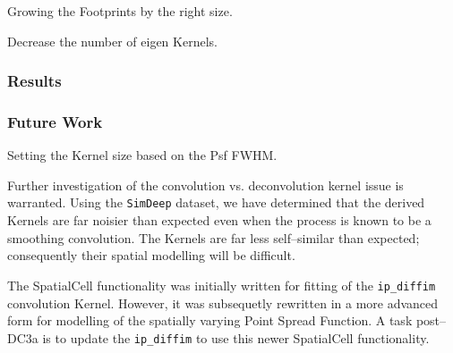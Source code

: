Growing the Footprints by the right size.

Decrease the number of eigen Kernels.

\subsubsection{Results}

\subsubsection{Future Work}

Setting the Kernel size based on the Psf FWHM.

Further investigation of the convolution vs. deconvolution kernel issue is warranted.  Using the {\tt SimDeep} dataset, we
have determined that the derived Kernels are far noisier than expected even when the process is known to be a smoothing convolution.
The Kernels are far less self--similar than expected; consequently their spatial modelling will be difficult.

The SpatialCell functionality was initially written for fitting of the {\tt ip\_diffim} convolution Kernel.  However, it was subsequetly rewritten in a more advanced
form for modelling of the spatially varying Point Spread Function.  A task post--DC3a is to update the {\tt ip\_diffim} to use this
newer SpatialCell functionality.
